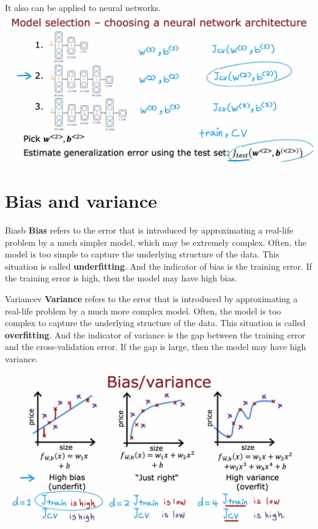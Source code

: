 \par
It also can be applied to neural networks.\\
\includegraphics*[width=\textwidth]{images/10.6}
\newpage
\section{Bias and variance}
\begin{dfnbox}{Bias}{b}
    \textbf{Bias} refers to the error that is introduced by approximating a real-life problem by a much simpler model, which may be extremely complex.
    Often, the model is too simple to capture the underlying structure of the data. This situation is called \textbf{underfitting}.
    And the indicator of bias is the training error. If the training error is high, then the model may have high bias.
\end{dfnbox}
\begin{dfnbox}{Variance}{v}
    \textbf{Variance} refers to the error that is introduced by approximating a real-life problem by a much more complex model.
    Often, the model is too complex to capture the underlying structure of the data. This situation is called \textbf{overfitting}.
    And the indicator of variance is the gap between the training error and the cross-validation error. If the gap is large, then the model may have high variance.
\end{dfnbox}
\includegraphics*[width=\textwidth]{images/10.7}
